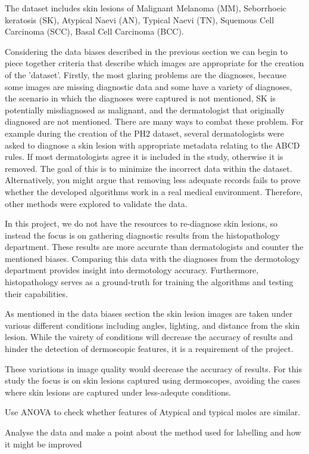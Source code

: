 The dataset includes skin lesions of Malignant Melanoma (MM), Seborrhoeic keratosis (SK), Atypical Naevi (AN), Typical Naevi (TN), Squemous Cell Carcinoma (SCC), Basal Cell Carcinoma (BCC). 

Considering the data biases described in the previous section we can begin to piece together criteria that describe which images are appropriate for the creation of the 'dataset'. Firstly, the most glaring problems are the diagnoses, because some images are missing diagnostic data and some have a variety of diagnoses, the scenario in which the diagnoses were captured is not mentioned, 
SK is potentially misdiagnosed as malignant, and the dermatologist that originally diagnosed are not mentioned. There are many ways to combat these problem. For example during the creation of the PH2 dataset\cite{mendonca2013}, several dermatologists were asked to diagnose a skin lesion with appropriate metadata relating to the ABCD rules. If most dermatologists agree it is included in the study, otherwise it is removed. The goal of this is to minimize the incorrect data within the dataset. Alternatively, you might argue that removing less adequate records fails to prove whether the developed algorithms work in a real medical environment. Therefore, other methods were explored to validate the data.

In this project, we do not have the resources to re-diagnose skin lesions, so instead the focus is on gathering diagnostic results from the histopathology department. These results are more accurate than dermatologists\cite{} and counter the mentioned biases. Comparing this data with the diagnoses from the dermotology department provides insight into dermotology accuracy. Furthermore, histopathology serves as a ground-truth for training the algorithms and testing their capabilities.

As mentioned in the data biases section the skin lesion images are taken under various different conditions including angles, lighting, and distance from the skin lesion. While the vairety of conditions will decrease the accuracy of results and hinder the detection of dermoscopic features, it is a requirement of the project. 

These variations in image quality would decrease the accuracy of results. For this study the focus is on skin lesions captured using dermoscopes, avoiding the cases where skin lesions are captured under less-adequte conditions.


Use ANOVA to check whether features of Atypical and typical moles are similar.







Analyse the data and make a point about the method used for labelling and how it might be improved
